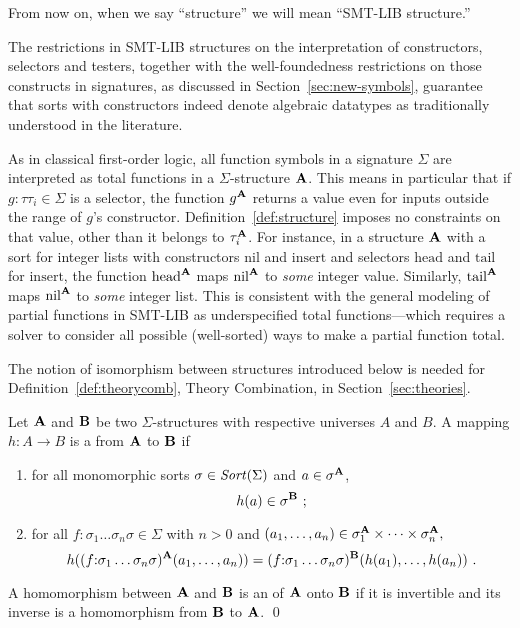 From now on, when we say ``structure'' we will mean ``SMT-LIB structure.''

\begin{remark}
The restrictions in SMT-LIB structures on the interpretation 
of constructors, selectors and testers,
together with the well-foundedness restrictions on those constructs in signatures,
as discussed in Section~\ref{sec:new-symbols},
guarantee that sorts with constructors indeed denote algebraic datatypes
as traditionally understood in the literature.
\end{remark}

\begin{remark}
As in classical first-order logic, all function symbols in a signature $\Sigma$ 
are interpreted as total functions in a $\Sigma$-structure $\mathbf{A}$.  
This means in particular that if $g{:}\tau\tau_i \in \Sigma$ is a selector,
the function $g^{\mathbf{A}}$ returns a value even for inputs
outside the range of $g$'s constructor.
Definition~\ref{def:structure} imposes no constraints on that value,
other than it belongs to $\tau_i^{\mathbf{A}}$.
For instance, in a structure $\mathbf{A}$ with a sort for integer lists with constructors
$\mathrm{nil}$ and $\mathrm{insert}$ and 
selectors $\mathrm{head}$ and $\mathrm{tail}$ for $\mathrm{insert}$,
the function $\mathrm{head}^{\mathbf{A}}$ maps $\mathrm{nil}^{\mathbf{A}}$ 
to \emph{some} integer value.
Similarly,
$\mathrm{tail}^{\mathbf{A}}$ maps $\mathrm{nil}^{\mathbf{A}}$ to \emph{some} integer list.
This is consistent with the general modeling of partial functions 
in SMT-LIB as underspecified total functions---which requires a solver 
to consider all possible (well-sorted) ways to make a partial function total.
\end{remark}


The notion of isomorphism between structures introduced below 
is needed for Definition~\ref{def:theorycomb}, Theory Combination,
in Section~\ref{sec:theories}.

\begin{definition}[Isomorphism]
Let $\mathbf{A}$ and $\mathbf{B}$ be two $\Sigma$-structures 
with respective universes $A$ and $B$.
A mapping $h:A \to B$ is a  from $\mathbf{A}$ to $\mathbf{B}$
if
\begin{enumerate}
\item
for all monomorphic sorts $\sigma \in \mathit{Sort}(\Sigma)$ and $a \in \sigma^{\mathbf{A}}$,
\[
 h(a) \in  \sigma^{\str B}\ ;
\]
\item
for all $f{:}\sigma_1\ldots\sigma_n\sigma \in \Sigma$ with $n > 0$
and 
\(
 (a_1, \ldots, a_n) \in 
 \sigma_1^{\mathbf{A}} \times \cdots \times \sigma_n^{\mathbf{A}} ,
\)
\[
 h((f{:}\sigma_1\ldots\sigma_n\sigma)^{\str A}(a_1, \ldots, a_n)) = 
 (f{:}\sigma_1\ldots\sigma_n\sigma)^{\str B}(h(a_1), \ldots, h(a_n)) \ . 
\]
\end{enumerate}
%
A homomorphism between $\mathbf{A}$ and $\mathbf{B}$ is 
an  of $\mathbf{A}$ onto $\mathbf{B}$
if it is invertible and its inverse is a homomorphism from $\mathbf{B}$ to $\mathbf{A}$. 
\qed
\end{definition}

